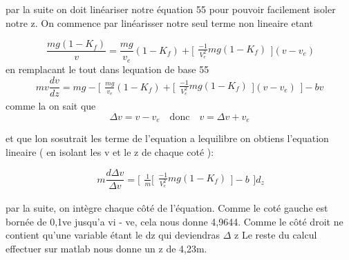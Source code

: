 \documentclass{article}
\begin{document}
par la suite on doit linéariser notre équation 55 pour pouvoir facilement isoler notre z. On commence par linéarisser notre seul terme non lineaire etant 

\begin{equation}
\ \frac{mg ( 1- K_{f})}{v} = \frac{mg}{v_{e}}(1-K_{f})+
\Bigg[\begin{array}{cc}
    \frac{-1}{V_{e}^2}mg(1-K_{f})
    \end{array}\Bigg]
    (v-v_{e})
\end{equation}
en remplacant le tout dans lequation de base 55
\begin{equation}
mv \frac{dv}{dz} = mg - \Bigg[\begin{array}{cc}
\frac{mg}{v_{e}}(1-K_{f})+
\Bigg[\begin{array}{cc}
    \frac{-1}{V_{e}^2}mg(1-K_{f})
    \end{array}\Bigg]
    (v-v_{e}) \end{array}\Bigg] - bv
\end{equation}
comme la on sait que
\begin{equation}
\Delta v = v - v_{e}  \quad  \textrm{donc} \quad    v = \Delta v+ v_{e}
\end{equation}

et que lon sosutrait les terme de l'equation a lequilibre on obtiens l'equation lineaire  ( en isolant les v et le z de chaque coté ):

\begin{equation}
\ m \frac{d \Delta v}{\Delta v}= \Bigg[\begin{array}{cc} \frac{1}{m} \Bigg[\begin{array}{cc}
    \frac{-1}{V_{e}^2}mg(1-K_{f})
    \end{array}\Bigg]  - b\end{array}\Bigg] d_{z}
\end{equation}

par la suite, on intègre chaque côté de l'équation. Comme le coté gauche est bornée de 0,1ve jusqu'a vi - ve, cela nous donne 4,9644. Comme le côté droit ne contient qu'une variable étant le dz qui deviendras $\Delta$ z
 Le reste du calcul effectuer sur matlab nous donne un z de 4,23m.
 
 
\end{document}

